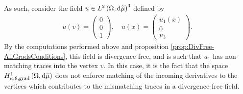 As such, consider the field $u\in L^{2}\left( \Omega,\mathrm{d} \widetilde{\mu} \right)^3$ defined by
\begin{align*}
    u(v) = \begin{pmatrix} 0 \\ 0 \\ 1 \end{pmatrix},
    \quad
    u(x) = \begin{pmatrix} u_1(x) \\ 0 \\ u_3 \end{pmatrix}.
\end{align*}
By the computations performed above and proposition \ref{prop:DivFree-AllGradsConditions}, this field is divergence-free, and is such that $u_1$ has non-matching traces into the vertex $v$.
In this case, it is the fact that the space $H^1_{\kappa,\theta,\mathrm{grad}}\left( \Omega, \mathrm{d}\widetilde{\mu} \right)$ does not enforce matching of the incoming derivatives to the vertices which contributes to the mismatching traces in a divergence-free field.
